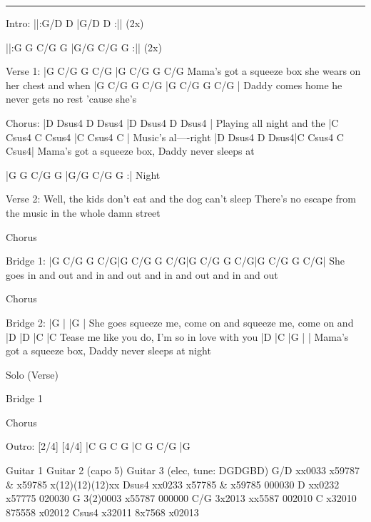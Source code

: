 \noindent\rule{\columnwidth}{1pt}

\begin{lstsong}
Intro:
||:G/D    D  |G/D    D :|| (2x)

||:G G C/G G |G/G  C/G G :|| (2x)

Verse 1:
|G      C/G   G       C/G    |G        C/G G         C/G
 Mama's got a squeeze box she wears on her chest and when
|G     C/G   G       C/G  |G     C/G G        C/G    |
 Daddy comes home he never gets no rest 'cause she's

Chorus:
|D       Dsus4 D   Dsus4 |D   Dsus4  D  Dsus4  |
 Playing all night                      and the
|C       Csus4 C   Csus4 |C   Csus4  C         |
 Music's al----right
|D      Dsus4 D       Dsus4|C     Csus4 C      Csus4|
 Mama's got a squeeze box,  Daddy never sleeps at    

|G G C/G G |G/G  C/G G :|
 Night 

Verse 2:
Well, the kids don't eat and the dog can't sleep
There's no escape from the music in the whole damn street

Chorus

Bridge 1:
        |G  C/G G   C/G|G  C/G G   C/G|G  C/G G   C/G|G  C/G G  C/G|
She goes in and out and in and out and in and out and in and out

Chorus

Bridge 2:
        |G          |           |G         |          
She goes squeeze me, come on and squeeze me, come on and
|D                |D      |C              |C    
 Tease me like you do, I'm so in love with you
|D                        |C                    |G     |     |
 Mama's got a squeeze box, Daddy never sleeps at night

Solo (Verse)

Bridge 1

Chorus

Outro:
                 [2/4]      [4/4]
|C   G   C   G   |C   G C/G |G
\end{lstsong}
\begin{lsttab}
          Guitar 1     Guitar 2 (capo 5)  Guitar 3 (elec, tune: DGDGBD)
G/D       xx0033       x59787 & x59785    x(12)(12)(12)xx
Dsus4     xx0233       x57785 & x59785    000030
D         xx0232       x57775             020030
G         3(2)0003     x55787             000000
C/G       3x2013       xx5587             002010
C         x32010       875558             x02012
Csus4     x32011       8x7568             x02013
\end{lsttab}
\newpage

